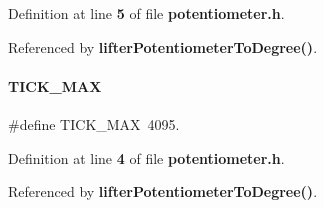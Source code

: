 Definition at line \textbf{ 5} of file \textbf{ potentiometer.\+h}.



Referenced by \textbf{ lifter\+Potentiometer\+To\+Degree()}.

\mbox{\label{potentiometer_8h_ad40f2bbc4e57baed2d9e900750d94a7f}} 
\paragraph{T\+I\+C\+K\+\_\+\+M\+AX}
{\footnotesize\ttfamily \#define T\+I\+C\+K\+\_\+\+M\+AX~4095.}



Definition at line \textbf{ 4} of file \textbf{ potentiometer.\+h}.



Referenced by \textbf{ lifter\+Potentiometer\+To\+Degree()}.

